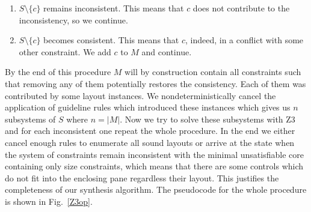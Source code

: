 \begin{enumerate}
\item $S\setminus\{c\}$ remains inconsistent. This means that $c$ does not contribute to the inconsistency, so
  we continue.
\item $S\setminus\{c\}$ becomes consistent. This means that $c$, indeed, in a conflict with some other
  constraint. We add $c$ to $M$ and continue.
\end{enumerate}

By the end of this procedure $M$ will by construction contain all constraints such that removing any of them potentially
restores the consistency. Each of them was contributed by some layout instances. We nondeterministically
cancel the application of guideline rules which introduced these instances which gives us $n$ subsystems of $S$ where $n=|M|$.
Now we try to solve these subsystems with \textsc{Z3} and for each inconsistent one repeat the whole procedure. In the
end we either cancel enough rules to enumerate all sound layouts or arrive at the state when the system of
constraints remain inconsistent with the minimal unsatisfiable core containing only size constraints, which means that
there are some controls which do not fit into the enclosing pane regardless their layout. This justifies the completeness
of our synthesis algorithm. The pseudocode for the whole procedure is shown in Fig.~\ref{Z3op}.

